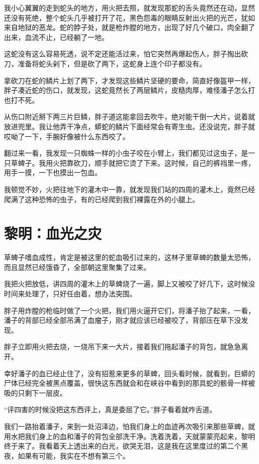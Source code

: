 我小心翼翼的走到蛇头的地方，用火把去照，就发现那蛇的舌头竟然还在动，显然还没有死绝，整个蛇头几乎被打开了花，黑色怨毒的眼睛反射出火把的光芒，犹如来自地狱的恶龙。蛇的脖子处，就是枪炸膛的地方，出现了好几个破口，肉全翻了出来，血流不止，已经躺了一地。

这蛇没有这么容易死透，说不定还能活过来，怕它突然再爆起伤人，胖子掏出砍刀，准备将蛇头剁下，但是砍了两下，这蛇身上连个印子都没有。

拿砍刀在蛇的鳞片上划了两下，才发现这些鳞片坚硬的要命，简直好像盔甲一样，胖子凑近蛇的伤口，就发现，这蛇竟然长了两层鳞片，皮糙肉厚，难怪潘子怎么打也打不死。

从伤口附近掰下两三片巨鳞，胖子道这能拿回去吹牛，绝对能干倒一大片，说着就放进兜里。我让他弄干净点，蟒蛇的鳞片下面经常会有寄生虫。还没说完，胖子就哎呦了一下，手腕好像被什么东西咬了。

翻过来一看，我发现一只蜘蛛一样的小虫子咬在小臂上，我们都见过这虫子，是一只草蜱子。我用火把靠砍刀，顺手就把它烫了下来。这时候，自己的裤裆里一疼，用手一摸，一下也摸出一包血。

我顿觉不妙，火把往地下的灌木中一靠，就发现我们站的四周的灌木上，竟然已经爬满了这种恐怖的虫子，有的已经爬到我们裸露在外的小腿上。

\chapter{黎明：血光之灾}

草蜱子嗜血成性，肯定是被这里的蛇血吸引过来的，这林子里草蜱的数量太恐怖，而且显然已经饿昏了，全部朝这里聚集了过来。

我把火把放低，讲四周的灌木上的草蜱烧了一遍，脚上又被咬了好几下，这时候没时间来处理了，只好任由着，想办法突围。

胖子用炸膛的枪临时做了一个火把，我们用火逼开它们，将潘子抬了起来，一看，潘子的背部已经全部吊满了血瘤子，刚才就应该已经被咬了，背部压在草下没发现。

胖子立即用火把去烧，一烧吊下来一大片，接着我们拖起潘子的背包，就急急离开。

幸好潘子的血已经止住了，没有招惹来更多的草蜱，回头看时候，就看到，巨蟒的尸体已经完全被黑点覆盖，很快这东西就会和在峡谷中看到的那具蛇的骸骨一样被吸的只剩下一层皮。

“评四害的时候没把这东西评上，真是委屈了它。”胖子看着就咋舌道。

我们一路抬着潘子，来到一处沼泽边，怕我们身上的血迹再次吸引来那些草蜱，就用水把我们身上的血和潘子的背包全部洗干净。洗着洗着，天就蒙蒙亮起来，黎明终于来了。我看着天上透出来的白光，欲哭无泪，这是我在这里度过的第二个黑夜，如果有可能，我实在不想有第三个。

